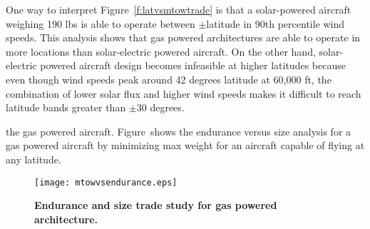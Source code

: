 One way to interpret Figure~\ref{f:latvsmtowtrade} is that a solar-powered aircraft weighing 190 lbs is able to operate between $\pm$\DIFdelbegin {}\DIFdelend \DIFaddbegin {}\DIFaddend latitude in 90th percentile wind speeds.  
This analysis shows that gas powered architectures are able to operate in more locations than solar-electric powered aircraft.  
\DIFdelbegin {}\DIFdelend On the other hand, solar-electric powered aircraft design becomes infeasible at higher latitudes because even though wind speeds peak around 42 degrees latitude at 60,000 ft, the combination of lower solar flux and higher wind speeds makes it difficult to reach latitude bands greater than $\pm$30 degrees. 

\DIFdelbegin {}\DIFdelend \DIFaddbegin {}\DIFaddend the gas powered aircraft\DIFdelbegin {}\DIFdelend \DIFaddbegin {}\DIFaddend . 
Figure~\DIFdelbegin \DIFdel{\ref{f:spanvsendurance} }\DIFdelend \DIFaddbegin \DIFadd{\ref{f:mtowvsendurance} }\DIFaddend shows the endurance versus size analysis for a gas powered aircraft by minimizing max \DIFdelbegin {}\DIFdelend \DIFaddbegin {}\DIFaddend weight for an aircraft capable of flying at any latitude. 
\DIFaddbegin {}\DIFaddend 

\begin{figure}[H]
	\begin{center}
	\DIFdelbeginFL %
\DIFdelendFL \DIFaddbeginFL \texttt{[image: mtowvsendurance.eps]}
    \DIFaddendFL \caption{\textbf{Endurance and size trade study for gas powered architecture.}}
	\DIFdelbeginFL %
\DIFdelendFL \DIFaddbeginFL \label{f:mtowvsendurance}
	\DIFaddendFL \end{center}
\end{figure}

